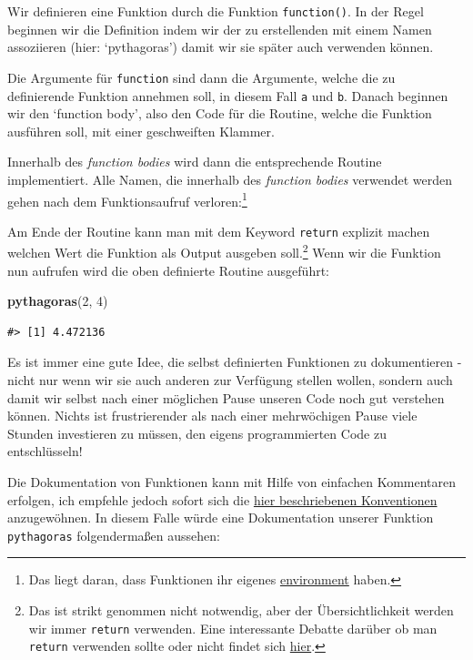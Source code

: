 \documentclass[]{book}
\newenvironment{Shaded}{\begin{snugshade}}{\end{snugshade}}
\newcommand{\KeywordTok}[1]{\textcolor[rgb]{0.13,0.29,0.53}{\textbf{#1}}}
\newcommand{\DecValTok}[1]{\textcolor[rgb]{0.00,0.00,0.81}{#1}}
\newcommand{\NormalTok}[1]{#1}
\let\rmarkdownfootnote\footnote%
\def\footnote{\protect\rmarkdownfootnote}
\begin{document}
Wir definieren eine Funktion durch die Funktion \texttt{function()}. In
der Regel beginnen wir die Definition indem wir der zu erstellenden mit
einem Namen assoziieren (hier: `pythagoras') damit wir sie später auch
verwenden können.

Die Argumente für \texttt{function} sind dann die Argumente, welche die
zu definierende Funktion annehmen soll, in diesem Fall \texttt{a} und
\texttt{b}. Danach beginnen wir den `function body', also den Code für
die Routine, welche die Funktion ausführen soll, mit einer geschweiften
Klammer.

Innerhalb des \emph{function bodies} wird dann die entsprechende Routine
implementiert. Alle Namen, die innerhalb des \emph{function bodies}
verwendet werden gehen nach dem Funktionsaufruf verloren:\footnote{Das
  liegt daran, dass Funktionen ihr eigenes
  \href{https://adv-r.hadley.nz/environments.html}{environment} haben.}

Am Ende der Routine kann man mit dem Keyword \texttt{return} explizit
machen welchen Wert die Funktion als Output ausgeben soll.\footnote{Das
  ist strikt genommen nicht notwendig, aber der Übersichtlichkeit werden
  wir immer \texttt{return} verwenden. Eine interessante Debatte darüber
  ob man \texttt{return} verwenden sollte oder nicht findet sich
  \href{https://stackoverflow.com/questions/11738823/explicitly-calling-return-in-a-function-or-not}{hier}.}
Wenn wir die Funktion nun aufrufen wird die oben definierte Routine
ausgeführt:

\begin{Shaded}
\begin{Highlighting}[]
\KeywordTok{pythagoras}\NormalTok{(}\DecValTok{2}\NormalTok{, }\DecValTok{4}\NormalTok{)}
\end{Highlighting}
\end{Shaded}

\begin{verbatim}
#> [1] 4.472136
\end{verbatim}

Es ist immer eine gute Idee, die selbst definierten Funktionen zu
dokumentieren - nicht nur wenn wir sie auch anderen zur Verfügung
stellen wollen, sondern auch damit wir selbst nach einer möglichen Pause
unseren Code noch gut verstehen können. Nichts ist frustrierender als
nach einer mehrwöchigen Pause viele Stunden investieren zu müssen, den
eigens programmierten Code zu entschlüsseln!

Die Dokumentation von Funktionen kann mit Hilfe von einfachen
Kommentaren erfolgen, ich empfehle jedoch sofort sich die
\href{https://r-pkgs.org/man.html\#man-functions}{hier beschriebenen
Konventionen} anzugewöhnen. In diesem Falle würde eine Dokumentation
unserer Funktion \texttt{pythagoras} folgendermaßen aussehen:
\end{document}
